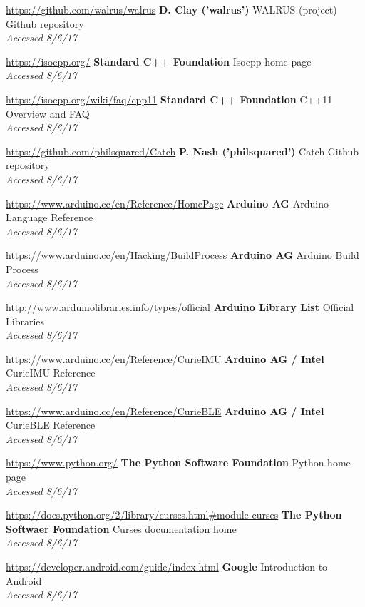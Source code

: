 \documentclass[a4paper]{article}
\begin{document}
\begin{thebibliography}{9}
\url{https://github.com/walrus/walrus}
\textbf{D. Clay ('walrus')}
WALRUS (project) Github repository
\\\textit{Accessed 8/6/17}

\url{https://isocpp.org/}
\textbf{Standard C++ Foundation}
Isocpp home page
\\\textit{Accessed 8/6/17}

\url{https://isocpp.org/wiki/faq/cpp11}
\textbf{Standard C++ Foundation}
C++11 Overview and FAQ
\\\textit{Accessed 8/6/17}

\url{https://github.com/philsquared/Catch}
\textbf{P. Nash ('philsquared')}
Catch Github repository
\\\textit{Accessed 8/6/17}

\url{https://www.arduino.cc/en/Reference/HomePage}
\textbf{Arduino AG}
Arduino Language Reference
\\\textit{Accessed 8/6/17}

\url{https://www.arduino.cc/en/Hacking/BuildProcess}
\textbf{Arduino AG}
Arduino Build Process
\\\textit{Accessed 8/6/17}

\url{http://www.arduinolibraries.info/types/official}
\textbf{Arduino Library List}
Official Libraries
\\\textit{Accessed 8/6/17}

\url{https://www.arduino.cc/en/Reference/CurieIMU}
\textbf{Arduino AG / Intel}
CurieIMU Reference
\\\textit{Accessed 8/6/17}

\url{https://www.arduino.cc/en/Reference/CurieBLE}
\textbf{Arduino AG / Intel}
CurieBLE Reference
\\\textit{Accessed 8/6/17}

\url{https://www.python.org/}
\textbf{The Python Software Foundation}
Python home page
\\\textit{Accessed 8/6/17}

\url{https://docs.python.org/2/library/curses.html#module-curses}
\textbf{The Python Softwaer Foundation}
Curses documentation home
\\\textit{Accessed 8/6/17}

\url{https://developer.android.com/guide/index.html}
\textbf{Google}
Introduction to Android
\\\textit{Accessed 8/6/17}


\end{thebibliography}
\end{document}
